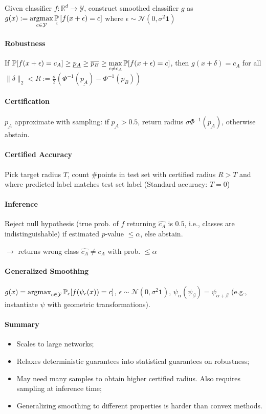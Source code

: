 Given classifier $f : \mathbb{R}^d \to \mathcal{Y}$, construct smoothed classifier $g$ as $\displaystyle g(x) := \argmax_{c \in \mathcal{Y}} \P_\epsilon \left[f(x+\epsilon) = c\right]$ where $\epsilon \sim \mathcal{N}(0, \sigma^2 \mathbf{1})$

\paragraph{Robustness}
If $\displaystyle \P[f(x+\epsilon) = c_A] \ge \underline{p_A} \ge \overline{p_B} \ge \max_{c \neq c_A} \P[f(x+\epsilon) = c]$, then $g(x+\delta) = c_A$ for all $\| \delta \|_2 < R := \frac{\sigma}{2} \left( \Phi^{-1}(\underline{p_A}) - \Phi^{-1}(\overline{p_B}) \right)$

\paragraph{Certification} $\underline{p_A}$ approximate with sampling: if $\underline{p_A} > 0.5$, return radius $\sigma \Phi^{-1}(\underline{p_A})$, otherwise abstain. 

\paragraph{Certified Accuracy}
Pick target radius $T$, count \#points in test set with certified radius $R > T$ and where predicted label matches test set label (Standard accuracy: $T=0$)

 \paragraph{Inference}
 Reject null hypothesis (true prob. of $f$ returning $\hat{c_A}$ is $0.5$, i.e., classes are indistinguishable) if estimated $p$-value $\le \alpha$, else abstain. 
 
 $\rightarrow$ returns wrong class $\hat{c_A} \neq c_A$ with prob. $\le \alpha$
 
 \paragraph{Generalized Smoothing} 
 $g(x) = \argmax_{c \in \mathcal{Y}} \P_\epsilon[f(\psi_\epsilon(x)) = c]$, $\epsilon \sim \mathcal{N}(0, \sigma^2\mathbf{1})$, $\psi_\alpha(\psi_\beta) = \psi_{\alpha+\beta}$ (e.g., instantiate $\psi$ with geometric transformations). 
 
\paragraph{Summary}
\begin{itemize}
\item Scales to large networks;
\item Relaxes deterministic guarantees into statistical guarantees on robustness;
\item May need many samples to obtain higher certified radius. Also requires sampling at inference time;
\item Generalizing smoothing to different properties is harder than convex methods.
\end{itemize}